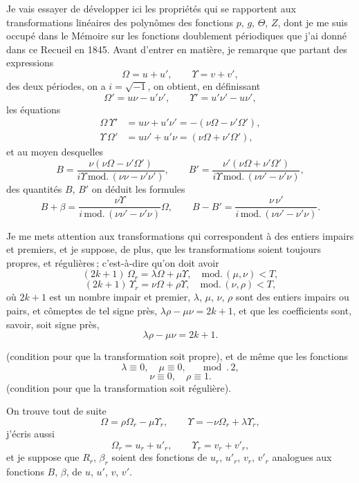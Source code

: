 \documentclass[11pt,a4paper]{article}
\theoremstyle{definition}
\begin{document}
Je vais essayer de d\'evelopper ici les propri\'et\'es qui se rapportent aux transformations
lin\'eaires des polyn\^omes des fonctions $p$, $g$, $\Theta$, $Z$, dont je me suis occup\'e dans le
M\'emoire sur les fonctions doublement p\'eriodiques que j'ai donn\'e dans ce Recueil en
1845. Avant d'entrer en mati\`ere, je remarque que partant des expressions
\[
\Omega = u + u',
\qquad \Upsilon = v + v',
\]
des deux p\'eriodes, on a $i = \sqrt{-1}$, on obtient, en d\'efinissant
\[
\Omega' = u\nu - u'\nu',
\qquad \Upsilon' = u'\nu' - u\nu',
\]
les \'equations
\begin{align*}
\Omega\,\Upsilon' &= u\nu + u'\nu' = -(\nu\Omega - \nu'\Omega'),\\
\Upsilon\,\Omega' &= u\nu' + u'\nu = (\nu\Omega + \nu'\Omega'),
\end{align*}
et au moyen desquelles
\[
B = \frac{\nu(\nu\Omega - \nu'\Omega')}{i\Upsilon\,\text{mod.}\,(\nu\nu - \nu'\nu')},
\qquad
B' = \frac{\nu'(\nu\Omega + \nu'\Omega')}{i\Upsilon\,\text{mod.}\,(\nu\nu' - \nu'\nu)},
\]
des quantit\'es $B$, $B'$ on d\'eduit les formules
\[
B + \beta = \frac{\nu\Upsilon}{i\,\text{mod.}\,(\nu\nu' - \nu'\nu)}\Omega,
\qquad
B - B' = \frac{\nu\,\nu'}{i\,\text{mod.}\,(\nu\nu' - \nu'\nu)}.
\]

\medskip

Je me mets attention aux transformations qui correspondent \`a des entiers impairs et
premiers, et je suppose, de plus, que les transformations soient toujours propres, et r\'eguli\`eres\,;
c'est-\`a-dire qu'on doit avoir
\[
(2k+1)\,\Omega_r = \lambda\Omega + \mu\Upsilon, \quad \text{mod.}\,(\mu, \nu) < T,
\]
\[
(2k+1)\,\Upsilon_r = \nu\Omega + \rho\Upsilon, \quad \text{mod.}\,(\nu, \rho) < T,
\]
o\`u $2k+1$ est un nombre impair et premier, $\lambda$, $\mu$, $\nu$, $\rho$ sont des entiers impairs ou
pairs, et c\^omeptes de tel signe pr\`es, $\lambda\rho - \mu\nu = 2k+1$, et que les coefficients
sont, savoir, soit signe pr\`es,
\[
\lambda\rho - \mu\nu = 2k+1.
\]

\medskip

(condition pour que la transformation soit propre), et de m\^eme que les fonctions
\[
\lambda \equiv 0,\quad \mu \equiv 0, \quad \mod.\,2,
\]
\[
\nu \equiv 0,\quad \rho \equiv 1.
\]
(condition pour que la transformation soit r\'eguli\`ere).

\medskip

On trouve tout de suite
\[
\Omega = \rho\Omega_r - \mu\Upsilon_r, \qquad \Upsilon = -\nu\Omega_r + \lambda\Upsilon_r,
\]
j'\'ecris aussi
\[
\Omega_r = u_r + u'_r,\qquad \Upsilon_r = v_r + v'_r,
\]
et je suppose que $R_r$, $\beta_r$ soient des fonctions de $u_r$, $u'_r$, $v_r$, $v'_r$ analogues aux fonctions
$B$, $\beta$, de $u$, $u'$, $v$, $v'$.
\end{document}
